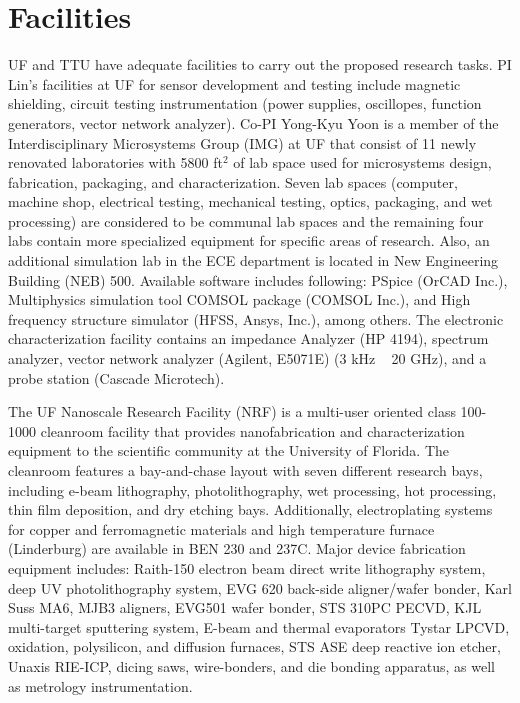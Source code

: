 \section{Facilities}
UF and TTU have adequate facilities to carry out the proposed research tasks.
PI Lin's facilities at UF for sensor development and testing include magnetic shielding, circuit testing instrumentation (power supplies, oscillopes, function generators, vector network analyzer). Co-PI Yong-Kyu Yoon is a member of the Interdisciplinary Microsystems Group (IMG) at UF that consist of 11 newly renovated laboratories with 5800 ft$^2$ of lab space used for microsystems design, fabrication, packaging, and characterization.  Seven lab spaces (computer, machine shop, electrical testing, mechanical testing, optics, packaging, and wet processing) are considered to be communal lab spaces and the remaining four labs contain more specialized equipment for specific areas of research. Also, an additional simulation lab in the ECE department is located in New Engineering Building (NEB) 500. Available software includes following: PSpice (OrCAD Inc.), Multiphysics simulation tool COMSOL package (COMSOL Inc.), and  High frequency structure simulator (HFSS, Ansys, Inc.), among others. The electronic characterization facility contains an impedance Analyzer (HP 4194),  spectrum analyzer,  vector network analyzer (Agilent, E5071E) (3 kHz ~ 20 GHz), and a probe station (Cascade Microtech).

The UF Nanoscale Research Facility (NRF) is a multi-user oriented class 100-1000 cleanroom facility that provides nanofabrication and characterization equipment to the scientific community at the University of Florida. The cleanroom features a bay-and-chase layout with seven different research bays, including e-beam lithography, photolithography, wet processing, hot processing, thin film deposition, and dry etching bays.  Additionally, electroplating systems for copper and ferromagnetic materials and high temperature furnace (Linderburg) are available in BEN 230 and 237C. Major device fabrication equipment includes: Raith-150 electron beam direct write lithography system, deep UV photolithography system, EVG 620 back-side aligner/wafer bonder, Karl Suss MA6, MJB3 aligners, EVG501 wafer bonder, STS 310PC PECVD, KJL multi-target sputtering system, E-beam and thermal evaporators Tystar LPCVD, oxidation, polysilicon, and diffusion furnaces, STS ASE deep reactive ion etcher, Unaxis RIE-ICP, dicing saws, wire-bonders, and die bonding apparatus, as well as metrology instrumentation.

